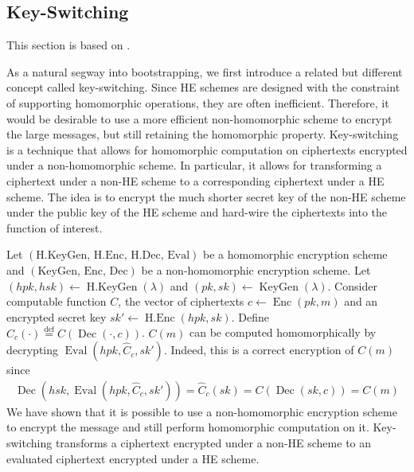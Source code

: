 \subsection*{Key-Switching}
This section is based on \cite{Bra18-survey}.

As a natural segway into bootstrapping, we first introduce a related but different concept called key-switching. Since HE schemes are designed with the constraint of supporting homomorphic operations, they are often inefficient. Therefore, it would be desirable to use a more efficient non-homomorphic scheme to encrypt the large messages, but still retaining the homomorphic property. Key-switching is a technique that allows for homomorphic computation on ciphertexts encrypted under a non-homomorphic scheme. In particular, it allows for transforming a ciphertext under a non-HE scheme to a corresponding ciphertext under a HE scheme. The idea is to encrypt the much shorter secret key of the non-HE scheme under the public key of the HE scheme and hard-wire the ciphertexts into the function of interest.

Let $(\text{H.KeyGen, H.Enc, H.Dec, Eval})$ be a homomorphic encryption scheme and $(\text{KeyGen, Enc, Dec})$ be a non-homomorphic encryption scheme. Let $(hpk,hsk) \leftarrow \operatorname{H.KeyGen}(\lambda)$ and $(pk,sk) \leftarrow \operatorname{KeyGen}(\lambda)$. Consider computable function $C$, the vector of ciphertexts $c \leftarrow \operatorname{Enc}(pk,m)$ and an encrypted secret key $sk' \leftarrow \operatorname{H.Enc}(hpk,sk)$. Define $\hat{C}_c(\cdot) \stackrel{\mathrm{def}}{=} C(\operatorname{Dec}(\cdot, c))$. $C(m)$ can be computed homomorphically by decrypting $\operatorname{Eval}(hpk,\hat{C}_c, sk')$. Indeed, this is a correct encryption of $C(m)$ since
\begin{equation*}
    \begin{aligned}
        \operatorname{Dec}(hsk,\operatorname{Eval}(hpk,\hat{C}_c, sk')) = \hat{C}_c(sk) = C(\operatorname{Dec}(sk, c)) = C(m)
    \end{aligned}
\end{equation*}
We have shown that it is possible to use a non-homomorphic encryption scheme to encrypt the message and still perform homomorphic computation on it. Key-switching transforms a ciphertext encrypted under a non-HE scheme to an evaluated ciphertext encrypted under a HE scheme.

